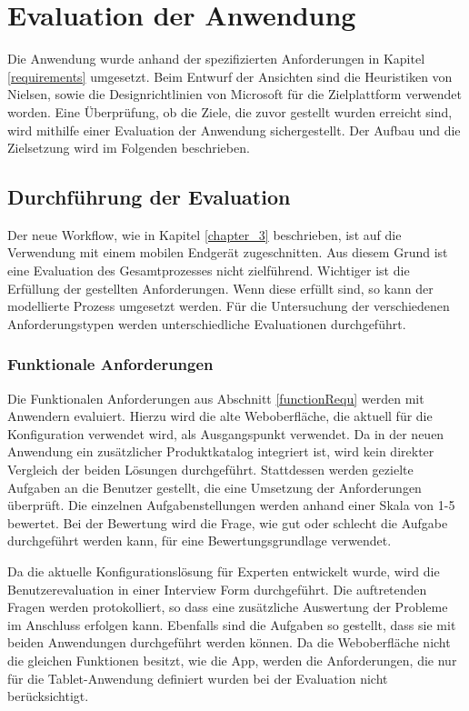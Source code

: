 \chapter{Evaluation der Anwendung}\label{chapter_6}
Die Anwendung wurde anhand der spezifizierten Anforderungen in Kapitel \ref{requirements} umgesetzt. Beim Entwurf der Ansichten sind die Heuristiken von Nielsen, sowie die Designrichtlinien von Microsoft für die Zielplattform verwendet worden. Eine Überprüfung, ob die Ziele, die zuvor gestellt wurden erreicht sind, wird mithilfe einer Evaluation der Anwendung sichergestellt. Der Aufbau und die Zielsetzung wird im Folgenden beschrieben. 

\section{Durchführung der Evaluation}
Der neue Workflow, wie in Kapitel \ref{chapter_3} beschrieben, ist auf die Verwendung mit einem mobilen Endgerät zugeschnitten. Aus diesem Grund ist eine Evaluation des Gesamtprozesses nicht zielführend. Wichtiger ist die Erfüllung der gestellten Anforderungen. Wenn diese erfüllt sind, so kann der modellierte Prozess umgesetzt werden. Für die Untersuchung der verschiedenen Anforderungstypen werden unterschiedliche Evaluationen durchgeführt.

\subsection{Funktionale Anforderungen}
Die Funktionalen Anforderungen aus Abschnitt \ref{functionRequ} werden mit Anwendern evaluiert. Hierzu wird die alte Weboberfläche, die aktuell für die Konfiguration verwendet wird, als Ausgangspunkt verwendet. Da in der neuen Anwendung ein zusätzlicher Produktkatalog integriert ist, wird kein direkter Vergleich der beiden Lösungen durchgeführt. Stattdessen werden gezielte Aufgaben an die Benutzer gestellt, die eine Umsetzung der Anforderungen überprüft. Die einzelnen Aufgabenstellungen werden anhand einer Skala von 1-5 bewertet. Bei der Bewertung wird die Frage, wie gut oder schlecht die Aufgabe durchgeführt werden kann, für eine Bewertungsgrundlage verwendet. 

Da die aktuelle Konfigurationslösung für Experten entwickelt wurde, wird die Benutzerevaluation in einer Interview Form durchgeführt. Die auftretenden Fragen werden protokolliert, so dass eine zusätzliche Auswertung der Probleme im Anschluss erfolgen kann. Ebenfalls sind die Aufgaben so gestellt, dass sie mit beiden Anwendungen durchgeführt werden können. Da die Weboberfläche nicht die gleichen Funktionen besitzt, wie die App, werden die Anforderungen, die nur für die Tablet-Anwendung definiert wurden bei der Evaluation nicht berücksichtigt. 


